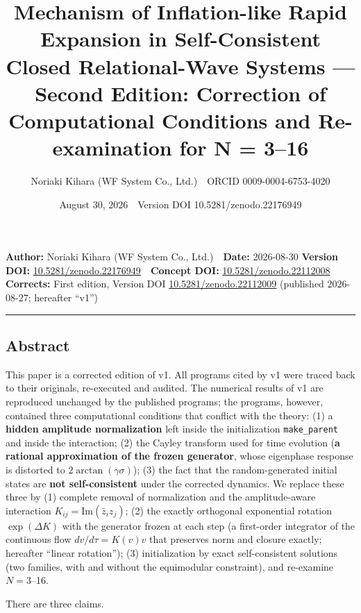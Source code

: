 \documentclass[
  10pt,
  a4paper,
]{article}
\title{Mechanism of Inflation-like Rapid Expansion in Self-Consistent
Closed Relational-Wave Systems --- Second Edition: Correction of
Computational Conditions and Re-examination for N = 3--16}
\author{Noriaki Kihara (WF System Co., Ltd.)　ORCID 0009-0004-6753-4020}
\date{August 30, 2026　Version DOI 10.5281/zenodo.22176949}
\begin{document}
\maketitle

{
\setcounter{tocdepth}{2}
\tableofcontents
}
\textbf{Author:} Noriaki Kihara (WF System Co., Ltd.)　\textbf{Date:}
2026-08-30 \textbf{Version DOI:}
\href{https://doi.org/10.5281/zenodo.22176949}{10.5281/zenodo.22176949}　\textbf{Concept
DOI:}
\href{https://doi.org/10.5281/zenodo.22112008}{10.5281/zenodo.22112008}
\textbf{Corrects:} First edition, Version DOI
\href{https://doi.org/10.5281/zenodo.22112009}{10.5281/zenodo.22112009}
(published 2026-08-27; hereafter ``v1'')

\begin{center}\rule{0.5\linewidth}{0.5pt}\end{center}

\subsection{Abstract}\label{abstract}

This paper is a corrected edition of v1. All programs cited by v1 were
traced back to their originals, re-executed and audited. The numerical
results of v1 are reproduced unchanged by the published programs; the
programs, however, contained three computational conditions that
conflict with the theory: (1) a \textbf{hidden amplitude normalization}
left inside the initialization \texttt{make\_parent} and inside the
interaction; (2) the Cayley transform used for time evolution (\textbf{a
rational approximation of the frozen generator}, whose eigenphase
response is distorted to \(2\arctan(\gamma\sigma)\)); (3) the fact that
the random-generated initial states are \textbf{not self-consistent}
under the corrected dynamics. We replace these three by (1) complete
removal of normalization and the amplitude-aware interaction
\(K_{ij}=\mathrm{Im}(\bar z_i z_j)\); (2) the exactly orthogonal
exponential rotation \(\exp(\Delta K)\) with the generator frozen at
each step (a first-order integrator of the continuous flow
\(dv/d\tau=K(v)v\) that preserves norm and closure exactly; hereafter
``linear rotation''); (3) initialization by exact self-consistent
solutions (two families, with and without the equimodular constraint),
and re-examine \(N=3\)--16.

There are three claims.
\end{document}

